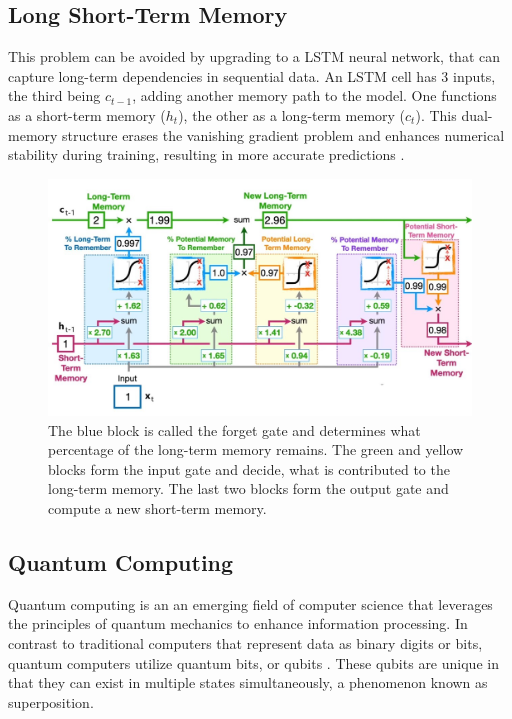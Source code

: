\subsection{Long Short-Term Memory}
This problem can be avoided by upgrading to a LSTM neural network, that can capture long-term dependencies in sequential data. 
An LSTM cell has 3 inputs, the third being $c_{t-1}$, adding another memory path to the model. One functions as a short-term memory ($h_t$), the other as a long-term memory ($c_t$). This dual-memory structure erases the vanishing gradient problem and enhances numerical stability during training, resulting in more accurate predictions \cite{chen2020quantum}.

\begin{figure}[h]
\centering
  \includegraphics[width=1.0\columnwidth]{gfx/lstm_detailed}
  \hfill
 \caption{
 \cite{starmer2022} The blue block is called the forget gate and determines what percentage of the long-term memory remains. The green and yellow blocks form the input gate and decide, what is contributed to the long-term memory. The last two blocks form the output gate and compute a new short-term memory.
 }
 \label{fig:lstm}
\end{figure}


\subsection{Quantum Computing}
Quantum computing is an an emerging field of computer science that leverages the principles of quantum mechanics to enhance information processing. In contrast to traditional computers that represent data as binary digits or bits, quantum computers utilize quantum bits, or qubits \cite{yanofsky2008quantum}. These qubits are unique in that they can exist in multiple states simultaneously, a phenomenon known as superposition.


